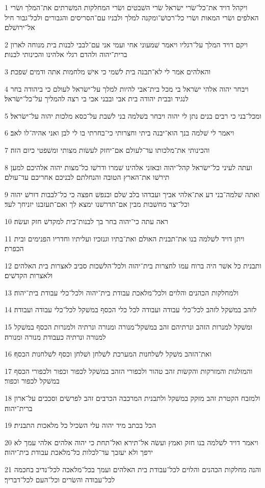 \par 1 ויקהל דויד את־כל־שׂרי ישׂראל שׂרי השׁבטים ושׂרי המחלקות המשׁרתים את־המלך ושׂרי האלפים ושׂרי המאות ושׂרי כל־רכושׁ־ומקנה למלך ולבניו עם־הסריסים והגבורים ולכל־גבור חיל אל־ירושׁלם׃
\par 2 ויקם דויד המלך על־רגליו ויאמר שׁמעוני אחי ועמי אני עם־לבבי לבנות בית מנוחה לארון ברית־יהוה ולהדם רגלי אלהינו והכינותי לבנות׃
\par 3 והאלהים אמר לי לא־תבנה בית לשׁמי כי אישׁ מלחמות אתה ודמים שׁפכת׃
\par 4 ויבחר יהוה אלהי ישׂראל בי מכל בית־אבי להיות למלך על־ישׂראל לעולם כי ביהודה בחר לנגיד ובבית יהודה בית אבי ובבני אבי בי רצה להמליך על־כל־ישׂראל׃
\par 5 ומכל־בני כי רבים בנים נתן לי יהוה ויבחר בשׁלמה בני לשׁבת על־כסא מלכות יהוה על־ישׂראל׃
\par 6 ויאמר לי שׁלמה בנך הוא־יבנה ביתי וחצרותי כי־בחרתי בו לי לבן ואני אהיה־לו לאב׃
\par 7 והכינותי את־מלכותו עד־לעולם אם־יחזק לעשׂות מצותי ומשׁפטי כיום הזה׃
\par 8 ועתה לעיני כל־ישׂראל קהל־יהוה ובאזני אלהינו שׁמרו ודרשׁו כל־מצות יהוה אלהיכם למען תירשׁו את־הארץ הטובה והנחלתם לבניכם אחריכם עד־עולם׃
\par 9 ואתה שׁלמה־בני דע את־אלהי אביך ועבדהו בלב שׁלם ובנפשׁ חפצה כי כל־לבבות דורשׁ יהוה וכל־יצר מחשׁבות מבין אם־תדרשׁנו ימצא לך ואם־תעזבנו יזניחך לעד׃
\par 10 ראה עתה כי־יהוה בחר בך לבנות־בית למקדשׁ חזק ועשׂה׃
\par 11 ויתן דויד לשׁלמה בנו את־תבנית האולם ואת־בתיו וגנזכיו ועליתיו וחדריו הפנימים ובית הכפרת׃
\par 12 ותבנית כל אשׁר היה ברוח עמו לחצרות בית־יהוה ולכל־הלשׁכות סביב לאצרות בית האלהים ולאצרות הקדשׁים׃
\par 13 ולמחלקות הכהנים והלוים ולכל־מלאכת עבודת בית־יהוה ולכל־כלי עבודת בית־יהוה׃
\par 14 לזהב במשׁקל לזהב לכל־כלי עבודה ועבודה לכל כלי הכסף במשׁקל לכל־כלי עבודה ועבודה׃
\par 15 ומשׁקל למנרות הזהב ונרתיהם זהב במשׁקל־מנורה ומנורה ונרתיה ולמנרות הכסף במשׁקל למנורה ונרתיה כעבודת מנורה ומנורה׃
\par 16 ואת־הזהב משׁקל לשׁלחנות המערכת לשׁלחן ושׁלחן וכסף לשׁלחנות הכסף׃
\par 17 והמזלגות והמזרקות והקשׂות זהב טהור ולכפורי הזהב במשׁקל לכפור וכפור ולכפורי הכסף במשׁקל לכפור וכפור׃
\par 18 ולמזבח הקטרת זהב מזקק במשׁקל ולתבנית המרכבה הכרבים זהב לפרשׂים וסככים על־ארון ברית־יהוה׃
\par 19 הכל בכתב מיד יהוה עלי השׂכיל כל מלאכות התבנית׃
\par 20 ויאמר דויד לשׁלמה בנו חזק ואמץ ועשׂה אל־תירא ואל־תחת כי יהוה אלהים אלהי עמך לא ירפך ולא יעזבך עד־לכלות כל־מלאכת עבודת בית־יהוה׃
\par 21 והנה מחלקות הכהנים והלוים לכל־עבודת בית האלהים ועמך בכל־מלאכה לכל־נדיב בחכמה לכל־עבודה והשׂרים וכל־העם לכל־דבריך׃


